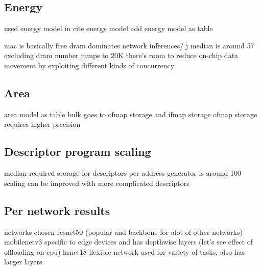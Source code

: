 \subsection{Energy}
\label{chap:hero:sim_platform:cigar_side}

used energy model in cite energy model
add energy model as table


mac is basically free
dram dominates
network inferences/ j median is around 57
excluding dram number jumps to 20K
there's room to reduce on-chip data movement by exploiting different kinds of
concurrency

\subsection{Area}
\label{chap:conv_gemm_equiv:overhead}

area model as table
bulk goes to ofmap storage and ifmap storage
ofmap storage requires higher precision

\subsection{Descriptor program scaling}
\label{chap:hero:sim_platform:cigar_side}

median required storage for descriptors per address generator is around 100
scaling can be improved with more complicated descriptors

\subsection{Per network results}
\label{chap:hero:sim_platform:cigar_side}

networks chosen
resnet50 (popular and backbone for alot of other networks)
mobilenetv3 specific to edge devices and has depthwise layers (let's see effect
of offloading on cpu)
hrnet18 flexible network used for variety of tasks, also has larger layers
